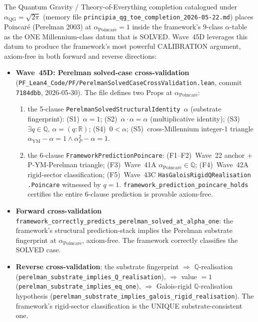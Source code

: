 \begin{remark}\label{rem:ch26-wave45d-lean}
The Quantum Gravity / Theory-of-Everything completion catalogued under $\alpha_{\mathrm{QG}} = \sqrt{2\pi}$ (memory file \texttt{principia\_qg\_toe\_completion\_2026-05-22.md}) places Poincar\'e (Perelman 2003) at $\alpha_{\mathrm{Poincar\acute{e}}} = 1$ inside the framework's 9-class $\alpha$-table as the ONE Millennium-class datum that is SOLVED. Wave~45D leverages this datum to produce the framework's most powerful CALIBRATION argument, axiom-free in both forward and reverse directions:
\begin{itemize}
  \item \textbf{Wave~45D: Perelman solved-case cross-validation} (\texttt{PF\_Lean4\_Code/PF/PerelmanSolvedCaseCrossValidation.lean}, commit \texttt{7184dbb}, 2026-05-30). The file defines two Props at $\alpha_{\mathrm{Poincar\acute{e}}}$:
  \begin{enumerate}
    \item the 5-clause \texttt{PerelmanSolvedStructuralIdentity $\alpha$} (substrate fingerprint): (S1)~$\alpha = 1$; (S2)~$\alpha \cdot \alpha = \alpha$ (multiplicative identity); (S3)~$\exists q \in \mathbb{Q},\, \alpha = (q : \mathbb{R})$; (S4)~$0 < \alpha$; (S5)~cross-Millennium integer-1 triangle $\alpha_{\mathrm{YM}} - \alpha = 1 \wedge \alpha_P^2 - \alpha = 1$.
    \item the 6-clause \texttt{FrameworkPredictionPoincare}: (F1--F2)~Wave~22 anchor $+$ P-YM-Perelman triangle; (F3)~Wave~41A $\alpha_{\mathrm{Poincar\acute{e}}} \in \mathbb{Q}$; (F4)~Wave~42A rigid-sector classification; (F5)~Wave~43C \texttt{HasGaloisRigidQRealisation .Poincare} witnessed by $q = 1$. \texttt{framework\_prediction\_poincare\_holds} certifies the entire 6-clause prediction is provable axiom-free.
  \end{enumerate}

  \item \textbf{Forward cross-validation} \texttt{framework\_correctly\_predicts\_perelman\_solved\_at\_alpha\_one}: the framework's structural prediction-stack implies the Perelman substrate fingerprint at $\alpha_{\mathrm{Poincar\acute{e}}}$, axiom-free. The framework correctly classifies the SOLVED case.

  \item \textbf{Reverse cross-validation}: the substrate fingerprint $\Rightarrow$ $\mathbb{Q}$-realisation (\texttt{perelman\_substrate\_implies\_Q\_realisation}), $\Rightarrow$ value $= 1$ (\texttt{perelman\_substrate\_implies\_eq\_one}), $\Rightarrow$ Galois-rigid $\mathbb{Q}$-realisation hypothesis (\texttt{perelman\_substrate\_implies\_galois\_rigid\_realisation}). The framework's rigid-sector classification is the UNIQUE substrate-consistent one.


\end{itemize}
\end{remark}

